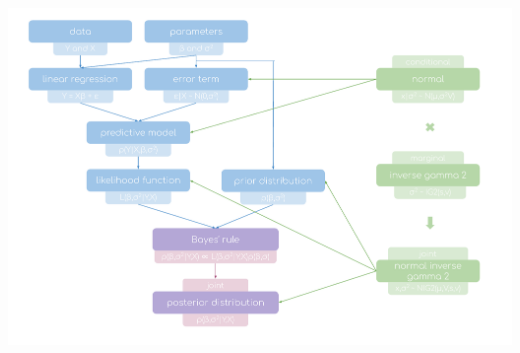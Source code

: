 \documentclass[notes,blackandwhite,mathsans]{beamer}
\begin{document}
\begin{frame}

\centering
\includegraphics[scale=0.45, trim= 1.8cm 2cm 2cm 0.5cm]{grphs/03conceptmap.pdf}

\end{frame}
\end{document}
